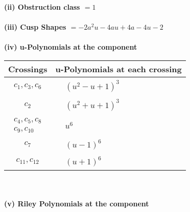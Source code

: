 \documentclass[1p]{elsarticle_modified}
\theoremstyle{definition}
\begin{document}
\flushleft \textbf{(ii) Obstruction class $= 1$}\\~\\
\flushleft \textbf{(iii) Cusp Shapes $= -2 a^2 u-4 a u+4 a-4 u-2$}\\~\\
\newpage\renewcommand{\arraystretch}{1}
\flushleft \textbf{(iv) u-Polynomials at the component}\newline \\
\begin{tabular}{m{50pt}|m{274pt}}
Crossings & \hspace{64pt}u-Polynomials at each crossing \\
\hline $$\begin{aligned}c_{1},c_{3},c_{6}\end{aligned}$$&$\begin{aligned}
&(u^2- u+1)^3
\end{aligned}$\\
\hline $$\begin{aligned}c_{2}\end{aligned}$$&$\begin{aligned}
&(u^2+u+1)^3
\end{aligned}$\\
\hline $$\begin{aligned}c_{4},c_{5},c_{8}\\c_{9},c_{10}\end{aligned}$$&$\begin{aligned}
&u^6
\end{aligned}$\\
\hline $$\begin{aligned}c_{7}\end{aligned}$$&$\begin{aligned}
&(u-1)^6
\end{aligned}$\\
\hline $$\begin{aligned}c_{11},c_{12}\end{aligned}$$&$\begin{aligned}
&(u+1)^6
\end{aligned}$\\
\hline
\end{tabular}\\~\\
\newpage\renewcommand{\arraystretch}{1}
\flushleft \textbf{(v) Riley Polynomials at the component}\newline \\
\end{document}
